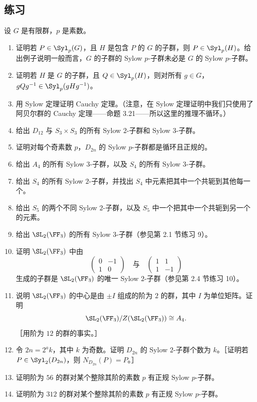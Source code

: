 \subsection*{练习}
设 $G$ 是有限群，$p$ 是素数。
\begin{enumerate}[label=\arabic*.]
  \item 证明若 $P\in\Syl_p(G)$，且 $H$ 是包含 $P$ 的 $G$ 的子群，则 $P\in\Syl_p(H)$。给出例子说明一般而言，$G$ 的子群的 Sylow $p$-子群未必是 $G$ 的 Sylow $p$-子群。
  \item 证明若 $H$ 是 $G$ 的子群，且 $Q\in\Syl_p(H)$，则对所有 $g\in G$，$gQg^{-1}\in\Syl_p(gHg^{-1})$。
  \item 用 Sylow 定理证明 Cauchy 定理。（注意，在 Sylow 定理证明中我们只使用了阿贝尔群的 Cauchy 定理——命题 3.21——所以这里的推理不循环。）
  \item 给出 $D_{12}$ 与 $S_3\times S_3$ 的所有 Sylow $2$-子群和 Sylow $3$-子群。
  \item 证明对每个奇素数 $p$，$D_{2n}$ 的 Sylow $p$-子群都是循环且正规的。
  \item 给出 $A_4$ 的所有 Sylow $3$-子群，以及 $S_4$ 的所有 Sylow $3$-子群。
  \item 给出 $S_4$ 的所有 Sylow $2$-子群，并找出 $S_4$ 中元素把其中一个共轭到其他每一个。
  \item 给出 $S_5$ 的两个不同 Sylow $2$-子群，以及 $S_5$ 中一个把其中一个共轭到另一个的元素。
  \item 给出 $\SL_2(\FF_3)$ 的所有 Sylow $3$-子群（参见第 2.1 节练习 9）。
  \item 证明 $\SL_2(\FF_3)$ 中由
  \[
    \begin{pmatrix}0&-1\\1&0\end{pmatrix}
    \quad\text{与}\quad
    \begin{pmatrix}1&1\\1&-1\end{pmatrix}
  \]
  生成的子群是 $\SL_2(\FF_3)$ 的唯一 Sylow $2$-子群（参见第 2.4 节练习 10）。
  \item 说明 $\SL_2(\FF_3)$ 的中心是由 $\pm I$ 组成的阶为 $2$ 的群，其中 $I$ 为单位矩阵。证明
  \[
    \SL_2(\FF_3)/Z(\SL_2(\FF_3))\cong A_4.
  \]
  ［用阶为 $12$ 的群的事实。］
  \item 令 $2n=2^ak$，其中 $k$ 为奇数。证明 $D_{2n}$ 的 Sylow $2$-子群个数为 $k$。［证明若 $P\in\Syl_2(D_{2n})$，则 $N_{D_{2n}}(P)=P$。］
  \item 证明阶为 $56$ 的群对某个整除其阶的素数 $p$ 有正规 Sylow $p$-子群。
  \item 证明阶为 $312$ 的群对某个整除其阶的素数 $p$ 有正规 Sylow $p$-子群。

\end{enumerate}
